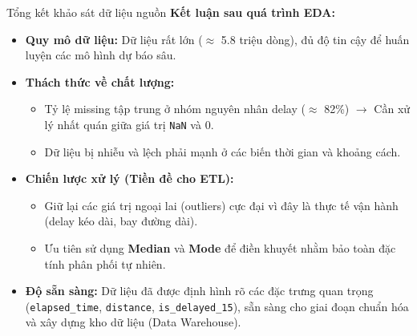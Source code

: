 \begin{frame}{Tổng kết khảo sát dữ liệu nguồn}
  \textbf{Kết luận sau quá trình EDA:}
  \begin{itemize}
    \item \textbf{Quy mô dữ liệu:} Dữ liệu rất lớn ($\approx$ 5.8 triệu dòng), đủ độ tin cậy để huấn luyện các mô hình dự báo sâu.
    \item \textbf{Thách thức về chất lượng:} 
      \begin{itemize}
        \item Tỷ lệ missing tập trung ở nhóm nguyên nhân delay ($\approx$ 82\%) $\rightarrow$ Cần xử lý nhất quán giữa giá trị \texttt{NaN} và $0$.
        \item Dữ liệu bị nhiễu và lệch phải mạnh ở các biến thời gian và khoảng cách.
      \end{itemize}
    \item \textbf{Chiến lược xử lý (Tiền đề cho ETL):}
      \begin{itemize}
        \item Giữ lại các giá trị ngoại lai (outliers) cực đại vì đây là thực tế vận hành (delay kéo dài, bay đường dài).
        \item Ưu tiên sử dụng \textbf{Median} và \textbf{Mode} để điền khuyết nhằm bảo toàn đặc tính phân phối tự nhiên.
      \end{itemize}
    \item \textbf{Độ sẵn sàng:} Dữ liệu đã được định hình rõ các đặc trưng quan trọng (\texttt{elapsed\_time}, \texttt{distance}, \texttt{is\_delayed\_15}), sẵn sàng cho giai đoạn chuẩn hóa và xây dựng kho dữ liệu (Data Warehouse).
  \end{itemize}
\end{frame}